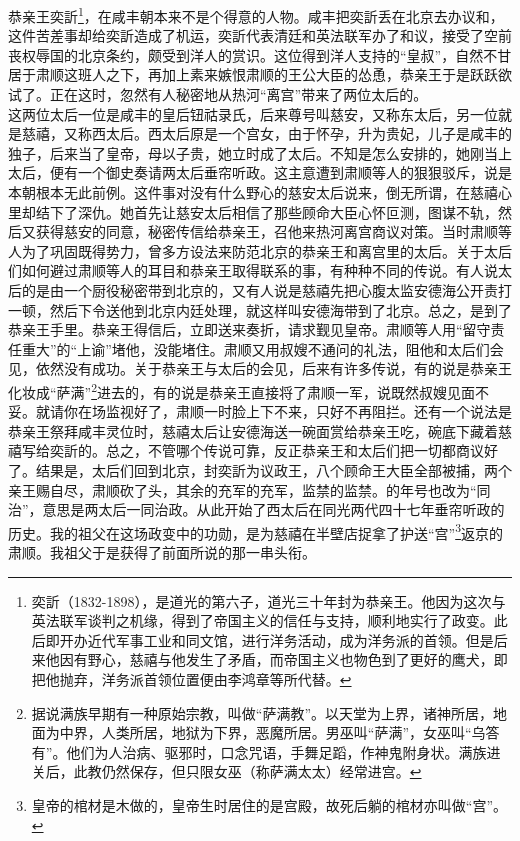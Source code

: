   恭亲王奕訢\footnote{奕訢（1832-1898），是道光的第六子，道光三十年封为恭亲王。他因为这次与英法联军谈判之机缘，得到了帝国主义的信任与支持，顺利地实行了政变。此后即开办近代军事工业和同文馆，进行洋务活动，成为洋务派的首领。但是后来他因有野心，慈禧与他发生了矛盾，而帝国主义也物色到了更好的鹰犬，即把他抛弃，洋务派首领位置便由李鸿章等所代替。}，在咸丰朝本来不是个得意的人物。咸丰把奕訢丢在北京去办议和，这件苦差事却给奕訢造成了机运，奕訢代表清廷和英法联军办了和议，接受了空前丧权辱国的北京条约，颇受到洋人的赏识。这位得到洋人支持的“皇叔”，自然不甘居于肃顺这班人之下，再加上素来嫉恨肃顺的王公大臣的怂恿，恭亲王于是跃跃欲试了。正在这时，忽然有人秘密地从热河“离宫”带来了两位太后的。\\

  这两位太后一位是咸丰的皇后钮祜录氏，后来尊号叫慈安，又称东太后，另一位就是慈禧，又称西太后。西太后原是一个宫女，由于怀孕，升为贵妃，儿子是咸丰的独子，后来当了皇帝，母以子贵，她立时成了太后。不知是怎么安排的，她刚当上太后，便有一个御史奏请两太后垂帘听政。这主意遭到肃顺等人的狠狠驳斥，说是本朝根本无此前例。这件事对没有什么野心的慈安太后说来，倒无所谓，在慈禧心里却结下了深仇。她首先让慈安太后相信了那些顾命大臣心怀叵测，图谋不轨，然后又获得慈安的同意，秘密传信给恭亲王，召他来热河离宫商议对策。当时肃顺等人为了巩固既得势力，曾多方设法来防范北京的恭亲王和离宫里的太后。关于太后们如何避过肃顺等人的耳目和恭亲王取得联系的事，有种种不同的传说。有人说太后的是由一个厨役秘密带到北京的，又有人说是慈禧先把心腹太监安德海公开责打一顿，然后下令送他到北京内廷处理，就这样叫安德海带到了北京。总之，是到了恭亲王手里。恭亲王得信后，立即送来奏折，请求觐见皇帝。肃顺等人用“留守责任重大”的“上谕”堵他，没能堵住。肃顺又用叔嫂不通问的礼法，阻他和太后们会见，依然没有成功。关于恭亲王与太后的会见，后来有许多传说，有的说是恭亲王化妆成“萨满”\footnote{据说满族早期有一种原始宗教，叫做“萨满教”。以天堂为上界，诸神所居，地面为中界，人类所居，地狱为下界，恶魔所居。男巫叫“萨满”，女巫叫“乌答有”。他们为人治病、驱邪时，口念咒语，手舞足蹈，作神鬼附身状。满族进关后，此教仍然保存，但只限女巫（称萨满太太）经常进宫。}进去的，有的说是恭亲王直接将了肃顺一军，说既然叔嫂见面不妥。就请你在场监视好了，肃顺一时脸上下不来，只好不再阻拦。还有一个说法是恭亲王祭拜咸丰灵位时，慈禧太后让安德海送一碗面赏给恭亲王吃，碗底下藏着慈禧写给奕訢的。总之，不管哪个传说可靠，反正恭亲王和太后们把一切都商议好了。结果是，太后们回到北京，封奕訢为议政王，八个顾命王大臣全部被捕，两个亲王赐自尽，肃顺砍了头，其余的充军的充军，监禁的监禁。的年号也改为“同治”，意思是两太后一同治政。从此开始了西太后在同光两代四十七年垂帘听政的历史。我的祖父在这场政变中的功勋，是为慈禧在半壁店捉拿了护送“宫”\footnote{皇帝的棺材是木做的，皇帝生时居住的是宫殿，故死后躺的棺材亦叫做“宫”。}返京的肃顺。我祖父于是获得了前面所说的那一串头衔。\\

